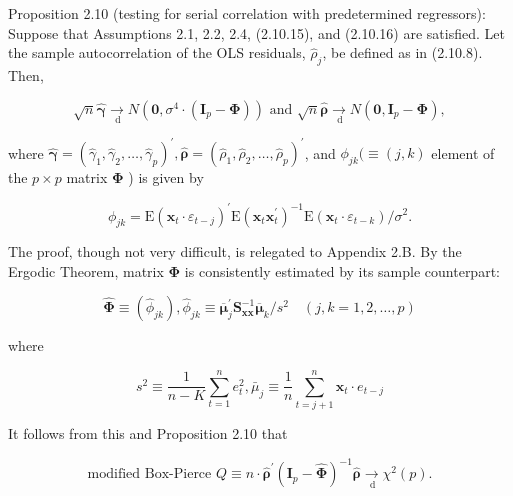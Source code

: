 \documentclass[10pt]{article}
\begin{document}
Proposition 2.10 (testing for serial correlation with predetermined regressors): Suppose that Assumptions 2.1, 2.2, 2.4, (2.10.15), and (2.10.16) are satisfied. Let the sample autocorrelation of the OLS residuals, $\hat{\rho}_{j}$, be defined as in (2.10.8). Then,


\begin{equation*}
\sqrt{n} \hat{\boldsymbol{\gamma}} \underset{\mathrm{~d}}{\rightarrow} N\left(\mathbf{0}, \sigma^{4} \cdot\left(\mathbf{I}_{p}-\boldsymbol{\Phi}\right)\right) \text { and } \sqrt{n} \hat{\boldsymbol{\rho}} \underset{\mathrm{~d}}{\rightarrow} N\left(\mathbf{0}, \mathbf{I}_{p}-\boldsymbol{\Phi}\right), \tag{2.10.17}
\end{equation*}


where $\hat{\boldsymbol{\gamma}}=\left(\hat{\gamma}_{1}, \hat{\gamma}_{2}, \ldots, \hat{\gamma}_{p}\right)^{\prime}, \hat{\boldsymbol{\rho}}=\left(\hat{\rho}_{1}, \hat{\rho}_{2}, \ldots, \hat{\rho}_{p}\right)^{\prime}$, and $\phi_{j k}(\equiv(j, k)$ element of the $p \times p$ matrix $\boldsymbol{\Phi}$ ) is given by


\begin{equation*}
\phi_{j k}=\mathrm{E}\left(\mathbf{x}_{t} \cdot \varepsilon_{t-j}\right)^{\prime} \mathrm{E}\left(\mathbf{x}_{t} \mathbf{x}_{t}^{\prime}\right)^{-1} \mathrm{E}\left(\mathbf{x}_{t} \cdot \varepsilon_{t-k}\right) / \sigma^{2} . \tag{2.10.18}
\end{equation*}


The proof, though not very difficult, is relegated to Appendix 2.B. By the Ergodic Theorem, matrix $\boldsymbol{\Phi}$ is consistently estimated by its sample counterpart:


\begin{equation*}
\widehat{\boldsymbol{\Phi}} \equiv\left(\hat{\phi}_{j k}\right), \hat{\phi}_{j k} \equiv \overline{\boldsymbol{\mu}}_{j}^{\prime} \mathbf{S}_{\mathbf{x x}}^{-1} \overline{\boldsymbol{\mu}}_{k} / s^{2} \quad(j, k=1,2, \ldots, p) \tag{2.10.19}
\end{equation*}


where

$$
s^{2} \equiv \frac{1}{n-K} \sum_{t=1}^{n} e_{t}^{2}, \bar{\mu}_{j} \equiv \frac{1}{n} \sum_{t=j+1}^{n} \mathbf{x}_{t} \cdot e_{t-j}
$$

It follows from this and Proposition 2.10 that


\begin{equation*}
\text { modified Box-Pierce } Q \equiv n \cdot \hat{\boldsymbol{\rho}}^{\prime}\left(\mathbf{I}_{p}-\widehat{\boldsymbol{\Phi}}\right)^{-1} \hat{\boldsymbol{\rho}} \underset{\mathrm{~d}}{\rightarrow} \chi^{2}(p) \text {. } \tag{2.10.20}
\end{equation*}
\end{document}
